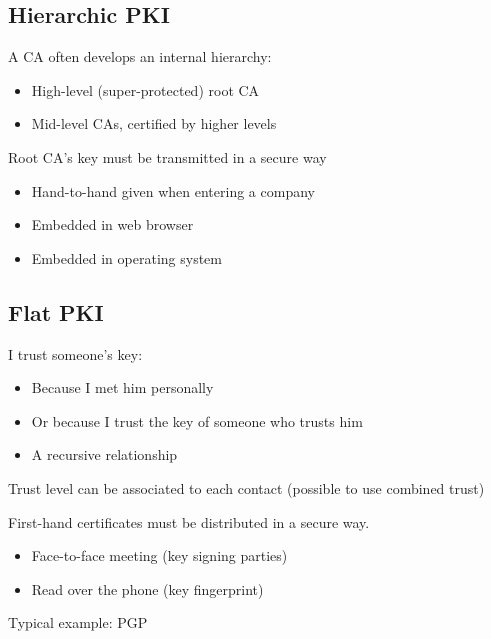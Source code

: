 \documentclass[12pt]{article}
\begin{document}
\subsection{Hierarchic PKI}
A CA often develops an internal hierarchy:
\begin{itemize}
	\item High-level (super-protected) root CA
	\item Mid-level CAs, certified by higher levels
\end{itemize}

Root CA's key must be transmitted in a secure way
\begin{itemize}
	\item Hand-to-hand given when entering a company
	\item Embedded in web browser
	\item Embedded in operating system
\end{itemize}



\subsection{Flat PKI}
I trust someone's key:
\begin{itemize}
	\item Because I met him personally
	\item Or because I trust the key of someone who trusts him
	\item A recursive relationship
\end{itemize}
Trust level can be associated to each contact (possible to use combined trust)

First-hand certificates must be distributed in a secure way.
\begin{itemize}
	\item Face-to-face meeting (key signing parties)
	\item Read over the phone (key fingerprint)
\end{itemize}

Typical example: PGP
\end{document}
